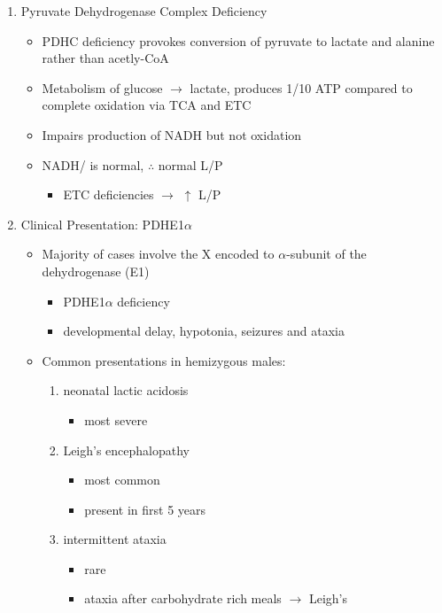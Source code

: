 \documentclass{scrartcl}
\begin{document}
\begin{enumerate}
\item Pyruvate Dehydrogenase Complex Deficiency
\label{sec:org901a832}
\begin{itemize}
\item PDHC deficiency provokes conversion of pyruvate to lactate and alanine rather than acetly-CoA
\item Metabolism of glucose \(\to\) lactate, produces 1/10 ATP compared to
complete oxidation via TCA and ETC
\item Impairs production of NADH but not oxidation
\item NADH/ is normal, \(\therefore\) normal L/P
\begin{itemize}
\item ETC deficiencies \(\to\) \(\uparrow\) L/P
\end{itemize}
\end{itemize}

\item Clinical Presentation: PDHE1\(\alpha\)
\label{sec:org5567b16}
\begin{itemize}
\item Majority of cases involve the X encoded to \(\alpha\)-subunit of the dehydrogenase (E1)
\begin{itemize}
\item PDHE1\(\alpha\) deficiency
\item developmental delay, hypotonia, seizures and ataxia
\end{itemize}

\item Common presentations in hemizygous males:
\begin{enumerate}
\item neonatal lactic acidosis
\begin{itemize}
\item most severe
\end{itemize}
\item Leigh's encephalopathy
\begin{itemize}
\item most common
\item present in first 5 years
\end{itemize}
\item intermittent ataxia
\begin{itemize}
\item rare
\item ataxia after carbohydrate rich meals \(\to\) Leigh's
\end{itemize}
\end{enumerate}


\end{itemize}
\end{enumerate}
\end{document}
